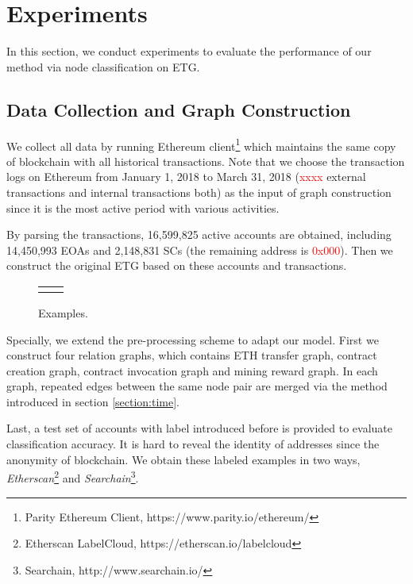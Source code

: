 
\section{Experiments}
In this section, we conduct experiments to evaluate the performance of our method via node classification on ETG.

\subsection{Data Collection and Graph Construction}
We collect all data by running Ethereum client\footnote{Parity Ethereum Client, https://www.parity.io/ethereum/} which maintains the same copy of blockchain with all historical transactions. Note that we choose the transaction logs on Ethereum from January 1, 2018 to March 31, 2018 (\textcolor{red}{xxxx} external transactions and internal transactions both) as the input of graph construction since it is the most active period with various activities.

By parsing the transactions, 16,599,825 active accounts are obtained, including 14,450,993 EOAs and 2,148,831 SCs (the remaining address is \textcolor{red}{0x000}). Then we construct the original ETG based on these accounts and transactions.

\begin{figure}[htbp]
\centering
\begin{tabular}{cc}
	\subfigure[Histogram of time std for all nodes.]{
		\label{fig:high_order}
    
	}&
	\subfigure[Histogram of time std for hack\&phish nodes.]{
		\label{fig:asymmetric}
    
	}
\end{tabular}
\caption{Examples.}
\end{figure}

Specially, we extend the pre-processing scheme to adapt our model. First we construct four relation graphs, which contains ETH transfer graph, contract creation graph, contract invocation graph and mining reward graph. In each graph, repeated edges between the same node pair are merged via the method introduced in section \ref{section:time}.

Last, a test set of accounts with label introduced before is provided to evaluate classification accuracy. It is hard to reveal the identity of addresses since the anonymity of blockchain. We obtain these labeled examples in two ways, \emph{Etherscan}\footnote{Etherscan LabelCloud, https://etherscan.io/labelcloud} and \emph{Searchain}\footnote{Searchain, http://www.searchain.io/}.




